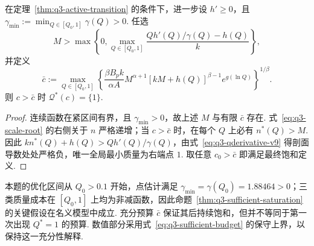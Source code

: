 \begin{proposition}[保证最终全局饱和的充分预算]\label{thm:q3-sufficient-saturation}
在定理~\ref{thm:q3-active-transition} 的条件下，进一步设 $h'\ge0$，且 $\gamma_{\min}:=\min_{Q\in[Q_0,1]}\gamma(Q)>0$. 任选
\[
M>\max\left\{0,\max_{Q\in[Q_0,1]}
\frac{Qh'(Q)/\gamma(Q)-h(Q)}k\right\},
\]
并定义
\begin{equation}\label{eq:q3-sufficient-budget}
\bar c:=\max_{Q\in[Q_0,1]}
\left\{\frac{\beta B_pk}{\alpha A}
M^{\alpha+1}[kM+h(Q)]^{\beta-1}e^{g(\ln Q)}\right\}^{1/\beta}.
\end{equation}
则 $c>\bar c$ 时 $\mathcal Q^*(c)=\{1\}$. %
\end{proposition}
\begin{proof}
连续函数在紧区间有界，且 $\gamma_{\min}>0$，故上述 $M$ 与有限 $\bar c$ 存在. 式~\eqref{eq:q3-scale-root} 的右侧关于 $n$ 严格递增；当 $c>\bar c$ 时，在每个 $Q$ 上必有 $n^*(Q)>M$. 因此 $kn^*(Q)+h(Q)>Qh'(Q)/\gamma(Q)$，由式~\eqref{eq:q3-qderivative-v9} 得剖面导数处处严格负，唯一全局最小质量为右端点 $1$. 取任意 $c_0>\bar c$ 即满足最终饱和定义. 
\end{proof}
本题的优化区间从 $Q_0>0.1$ 开始，点估计满足 $\gamma_{\min}=\gamma(Q_0)=1.88464>0$；三类质量成本在 $[Q_0,1]$ 上均为非减函数，因此命题~\ref{thm:q3-sufficient-saturation} 的关键假设在名义模型中成立. 充分预算 $\bar c$ 保证其后持续饱和，但并不等同于第一次出现 $Q^*=1$ 的预算. 数值部分采用式~\eqref{eq:q3-sufficient-budget} 的保守上界，以保持这一充分性解释. 

